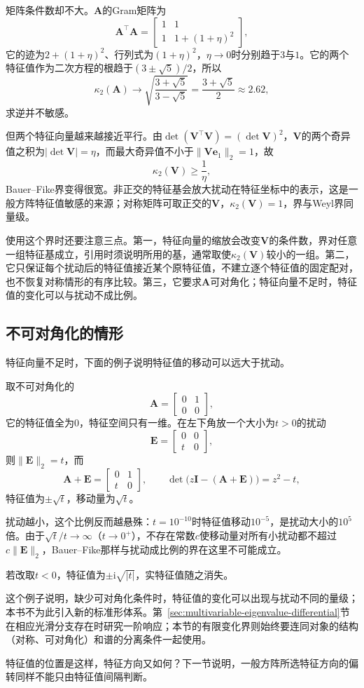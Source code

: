 矩阵条件数却不大。$\bm A$的Gram矩阵为
\[
 \bm A^\top\bm A=\begin{bmatrix}1&1\\1&1+(1+\eta)^2\end{bmatrix},
\]
它的迹为$2+(1+\eta)^2$、行列式为$(1+\eta)^2$，$\eta\to0$时分别趋于$3$与$1$。它的两个特征值作为二次方程的根趋于$(3\pm\sqrt5)/2$，所以
\[
 \kappa_2(\bm A)\to\sqrt{\frac{3+\sqrt5}{3-\sqrt5}}=\frac{3+\sqrt5}2\approx2.62 ,
\]
求逆并不敏感。

但两个特征向量越来越接近平行。由$\det(\bm V^\top\bm V)=(\det\bm V)^2$，$\bm V$的两个奇异值之积为$|\det\bm V|=\eta$，而最大奇异值不小于$\lVert\bm V\bm e_1\rVert_2=1$，故
\[
 \kappa_2(\bm V)\geq\frac1\eta ,
\]
Bauer--Fike界变得很宽。非正交的特征基会放大扰动在特征坐标中的表示，这是一般方阵特征值敏感的来源；对称矩阵可取正交的$\bm V$，$\kappa_2(\bm V)=1$，界与Weyl界同量级。

使用这个界时还要注意三点。第一，特征向量的缩放会改变$\bm V$的条件数，界对任意一组特征基成立，引用时须说明所用的基，通常取使$\kappa_2(\bm V)$较小的一组。第二，它只保证每个扰动后的特征值接近某个原特征值，不建立逐个特征值的固定配对，也不恢复对称情形的有序比较。第三，它要求$\bm A$可对角化；特征向量不足时，特征值的变化可以与扰动不成比例。

\subsection{不可对角化的情形}
特征向量不足时，下面的例子说明特征值的移动可以远大于扰动。
\begin{example}[特征值的移动远大于扰动]
\label{ex:ls-jordan-eigenvalue-sensitivity}
取不可对角化的
\[
 \bm A=\begin{bmatrix}0&1\\0&0\end{bmatrix},
\]
它的特征值全为$0$，特征空间只有一维。在左下角放一个大小为$t>0$的扰动
\[
 \bm E=\begin{bmatrix}0&0\\t&0\end{bmatrix},
\]
则$\lVert\bm E\rVert_2=t$，而
\[
 \bm A+\bm E=\begin{bmatrix}0&1\\t&0\end{bmatrix},\qquad
 \det\bigl(z\bm I-(\bm A+\bm E)\bigr)=z^2-t ,
\]
特征值为$\pm\sqrt t$，移动量为$\sqrt t$。

扰动越小，这个比例反而越悬殊：$t=10^{-10}$时特征值移动$10^{-5}$，是扰动大小的$10^5$倍。由于$\sqrt t/t\to\infty$（$t\to0^+$），不存在常数$c$使移动量对所有小扰动都不超过$c\lVert\bm E\rVert_2$，Bauer--Fike那样与扰动成比例的界在这里不可能成立。

若改取$t<0$，特征值为$\pm\mathrm i\sqrt{|t|}$，实特征值随之消失。
\end{example}
这个例子说明，缺少可对角化条件时，特征值的变化可以出现与扰动不同的量级；本书不为此引入新的标准形体系。第~\ref{sec:multivariable-eigenvalue-differential}节在相应光滑分支存在时研究一阶响应；本节的有限变化界则始终要连同对象的结构（对称、可对角化）和谱的分离条件一起使用。

特征值的位置是这样，特征方向又如何？下一节说明，一般方阵所选特征方向的偏转同样不能只由特征值间隔判断。
